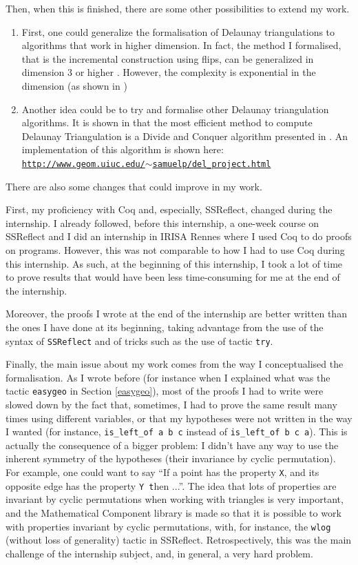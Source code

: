 \documentclass[a4paper,10pt]{article}
\def\ttt#1#2{{\tt{\color{black}#1} #2}}
\begin{document}
Then, when this is finished, there are some other possibilities to extend my work.
\begin{enumerate}
\item First, one could generalize the formalisation of Delaunay triangulations to algorithms that work in higher dimension. In fact, the method I formalised, that is the incremental construction using flips, can be generalized in dimension 3 or higher \cite{CompGeoAlgo}. However, the complexity is exponential in the dimension (as shown in \cite{IncrementalDimension})
\item Another idea could be to try and formalise other Delaunay triangulation algorithms. It is shown in \cite{Comparison} that the most efficient method to compute Delaunay Triangulation is a Divide and Conquer algorithm presented in \cite{AlgoDivide}. An implementation of this algorithm is shown here:\\
  \href{http://www.geom.uiuc.edu/~samuelp/del_project.html}{{\tt http://www.geom.uiuc.edu/$\sim$samuelp/del\_project.html}}
\end{enumerate}

There are also some changes that could improve in my work.

First, my proficiency with {\sc Coq} and, especially, {\sc SSReflect}, changed during the internship. I already followed, before this internship, a one-week course on {\sc SSReflect} and I did an internship in IRISA Rennes where I used {\sc Coq} to do proofs on programs. However, this was not comparable to how I had to use {\sc Coq} during this internship. As such, at the beginning of this internship, I took a lot of time to prove results that would have been less time-consuming for me at the end of the internship.

Moreover, the proofs I wrote at the end of the internship are better written than the ones I have done at its beginning, taking advantage from the use of the syntax of {\tt SSReflect} and of tricks such as the use of tactic {\tt try}.

\label{symmetry}
Finally, the main issue about my work comes from the way I conceptualised  the formalisation. As I wrote before (for instance when I explained what was the tactic {\tt easygeo} in Section \ref{easygeo}), most of the proofs I had to write were slowed down by the fact that, sometimes, I had to prove the same result many times using different variables, or that my hypotheses were not written in the way I wanted (for instance, {\tt is\_left\_of a b c} instead of {\tt is\_left\_of b c a}). This is actually the consequence of a bigger problem: I didn't have any way to use the inherent symmetry of the hypotheses (their invariance by cyclic permutation).
For example, one could want to say ``If a point has the property {\tt X}, and its opposite edge has the property \ttt{Y} then ...''. The idea that lots of properties are invariant by cyclic permutations when working with triangles is very important, and the {\sc Mathematical Component} library is made so that it is possible to work with properties invariant by cyclic permutations, with, for instance, the {\tt wlog} (without loss of generality) tactic in {\sc SSReflect}.
Retrospectively, this was the main challenge of the internship subject, and, in general, a very hard problem. 
\end{document}
